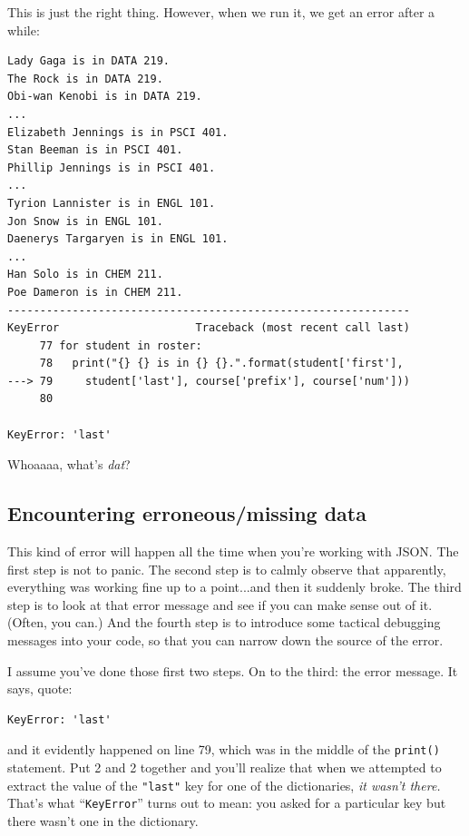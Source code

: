 This is just the right thing. However, when we run it, we get an error after a
while:


\begin{Verbatim}[fontsize=\footnotesize,samepage=true,frame=leftline,framesep=5mm,framerule=1mm]
Lady Gaga is in DATA 219.
The Rock is in DATA 219.
Obi-wan Kenobi is in DATA 219.
...
Elizabeth Jennings is in PSCI 401.
Stan Beeman is in PSCI 401.
Phillip Jennings is in PSCI 401.
...
Tyrion Lannister is in ENGL 101.
Jon Snow is in ENGL 101.
Daenerys Targaryen is in ENGL 101.
...
Han Solo is in CHEM 211.
Poe Dameron is in CHEM 211.
--------------------------------------------------------------
KeyError                     Traceback (most recent call last)
     77 for student in roster:
     78   print("{} {} is in {} {}.".format(student['first'], 
---> 79     student['last'], course['prefix'], course['num'])) 
     80

KeyError: 'last'
\end{Verbatim}

Whoaaaa, what's \textit{dat}?

\subsection{Encountering erroneous/missing data}

This kind of error will happen all the time when you're working with JSON. The
first step is not to panic. The second step is to calmly observe that
apparently, everything was working fine up to a point...and then it suddenly
broke. The third step is to look at that error message and see if you can make
sense out of it. (Often, you can.) And the fourth step is to introduce some
tactical debugging messages into your code, so that you can narrow down the
source of the error.

I assume you've done those first two steps. On to the third: the error message.
It says, quote:

\vspace{-.2in}
\begin{Verbatim}[fontsize=\normalsize,samepage=true,frame=leftline,framesep=5mm,framerule=1mm]
KeyError: 'last'
\end{Verbatim}

and it evidently happened on line 79, which was in the middle of the
\texttt{print()} statement. Put 2 and 2 together and you'll realize that when
we attempted to extract the value of the \texttt{"last"} key for one of the
dictionaries, \textit{it wasn't there.} That's what ``\texttt{KeyError}'' turns
out to mean: you asked for a particular key but there wasn't one in the
dictionary.

